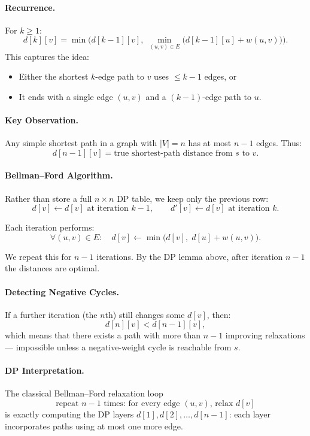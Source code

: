 \documentclass[9pt]{extarticle}
\begin{document}
\paragraph{Recurrence.}
For $k \ge 1$:
\[
  d[k][v]
    = \min\Big(
        d[k-1][v],\;
        \min_{(u,v)\in E} \big( d[k-1][u] + w(u,v) \big)
      \Big).
\]
This captures the idea:
\begin{itemize}
  \item Either the shortest $k$-edge path to $v$ uses $\le k-1$ edges, or
  \item It ends with a single edge $(u,v)$ and a $(k-1)$-edge path to $u$.
\end{itemize}

\paragraph{Key Observation.}
Any simple shortest path in a graph with $|V|=n$ has at most $n-1$ edges.  
Thus:
\[
  d[n-1][v] = \text{true shortest-path distance from $s$ to $v$}.
\]

\paragraph{Bellman--Ford Algorithm.}
Rather than store a full $n \times n$ DP table, we keep only the previous row:
\[
  d[v] \gets d[v] \text{ at iteration $k-1$}, \qquad
  d'[v] \gets d[v] \text{ at iteration $k$}.
\]

Each iteration performs:
\[
  \forall (u,v)\in E:
    \quad d[v] \gets \min\big( d[v],\; d[u] + w(u,v) \big).
\]

We repeat this for $n-1$ iterations.  
By the DP lemma above, after iteration $n-1$ the distances are optimal.

\paragraph{Detecting Negative Cycles.}
If a further iteration (the $n$th) still changes some $d[v]$, then:
\[
  d[n][v] < d[n-1][v],
\]
which means that there exists a path with more than $n-1$ improving relaxations—  
impossible unless a negative-weight cycle is reachable from $s$.

\paragraph{DP Interpretation.}
The classical Bellman--Ford relaxation loop
\[
  \text{repeat $n-1$ times: for every edge $(u,v)$, relax $d[v]$}
\]
is exactly computing the DP layers $d[1], d[2], \dots, d[n-1]$:
each layer incorporates paths using at most one more edge.
\end{document}
